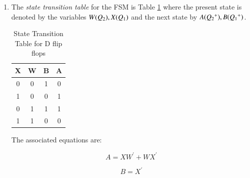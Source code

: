 \documentclass[journal,12pt,twocolumn]{IEEEtran}
\begin{document}
\begin{enumerate}[1.]
\item The {\em state transition table} for the FSM is Table \ref{table:counter_decoder} where the present state is denoted by the variables $W(Q\textsubscript{2}),X(Q\textsubscript{1})$ and the next state by $A(Q\textsubscript{2}\textsuperscript{+}),B(Q\textsubscript{1}\textsuperscript{+})$. 

\begin{table}[h!]
	\begin{center}
		\begin{tabular}{ |c|c|c|c| } 
			\hline
	X & W & B & A \\
			\hline
			0 & 0 & 1 & 0  \\ 
			\hline
			1 & 0 & 0 & 1  \\ 
			\hline
			0 & 1 & 1 & 1  \\ 
			\hline
			1 & 1 & 0 & 0 \\
			\hline
		\end{tabular}
		\caption{State Transition Table for D flip flops}
		\label{table:counter_decoder}
	\end{center}
\end{table}

The associated equations are:

\begin{equation}
	A = XW^{\prime}+WX^{\prime}
\end{equation}

\begin{equation}
	B = X^{\prime}
\end{equation}

\end{enumerate}
\end{document}
